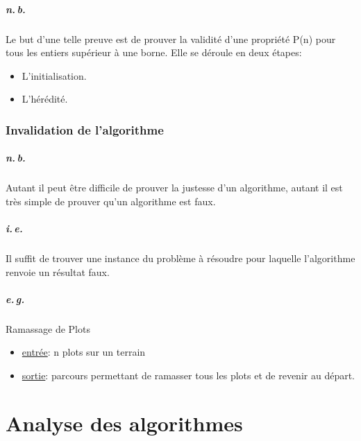 \documentclass{report}
\begin{document}
  \paragraph{n.\,b.} Le but d'une telle preuve est de prouver la validité d'une propriété P(n) pour tous les entiers supérieur à une borne. Elle se déroule en deux étapes:
  \begin{itemize}
    \item L'initialisation.
    \item L'hérédité.
  \end{itemize}

\subsection{Invalidation de l'algorithme}

  \paragraph{n.\,b.} Autant il peut être difficile de prouver la justesse d'un algorithme, autant il est très simple de prouver qu'un algorithme est faux.

  \paragraph{i.\,e.} Il suffit de trouver une instance du problème à résoudre pour laquelle l'algorithme renvoie un résultat faux.

  \paragraph{e.\,g.} Ramassage de Plots
  \begin{itemize}
    \item \underline{entrée}: n plots sur un terrain
    \item \underline{sortie}: parcours permettant de ramasser tous les plots et de revenir au départ.
  \end{itemize}

\chapter{Analyse des algorithmes}

  \setcounter{section}{0}
  \setcounter{algorithm}{0}

  \section{}
\end{document}

